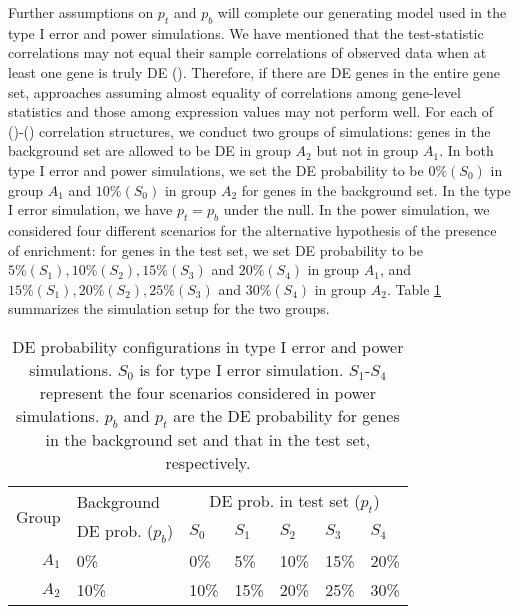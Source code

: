 	Further assumptions on $p_t$ and $p_b$ will complete our generating model used in the type I 
	error and power simulations. %
	We have mentioned that the test-statistic correlations may not equal their sample 
	correlations of observed data when at least one gene is truly DE (\thepapertobefinished). 
	Therefore, if there are DE genes in the entire gene set, 
	approaches assuming	almost equality of correlations among gene-level statistics and those 
	among expression values may not perform well. For each of (\aaCase)-(\fCase) correlation 
	structures, we conduct two groups of simulations: genes in the background set are allowed to be 
	DE in group $A_2$ but not in group $A_1$.  In both type I error and power 
	simulations, we set the DE probability to be $0\%(S_0)$ in group $A_1$ and $10\%(S_0)$ in group 
	$A_2$ for genes in the background set. In the type I error simulation, we have $p_t = p_b$ 
	under the null. In the power simulation, we considered four different scenarios for the 
	alternative hypothesis of the presence of enrichment: for genes in the test set, we set DE
	probability to be $5\% (S_1), 10\%(S_2), 15\%(S_3)$ and $20\%(S_4)$ in group $A_1$, and 
	$15\%(S_1),	20\%(S_2), 25\%(S_3)$ and $30\%(S_4)$ in group $A_2$. Table \ref{table:simusetup} 
	summarizes the simulation setup for the two groups.
	

	
	\begin{table}[!ht]
		\centering
		\caption[DE probability configurations in type I error and power simulations]{DE 
		probability configurations in type I error and power simulations. $S_0$ is for
			type I error simulation. $S_1$-$S_4$ represent the four scenarios considered in power 
			simulations. $p_b$ and $p_t$ are the DE probability for genes in the background set and 
			that in the test set, respectively.}		
		\begin{tabular}{rp{3.7cm}p{1.5cm}p{1.5cm}p{1.5cm}p{1.5cm}p{1.5cm}}
			\hline
			\multirow{2}{*}{Group} & 	Background & \multicolumn{5}{c}{DE prob. in test set 
			($p_t$)}\\  \cline{3-7}
			&DE prob. ($p_b$)&$S_0$ &$S_1$ &$S_2$ &$S_3$ &$S_4$\\
		\hline
			$A_1$ & 0\% & 0\%  & 5\% & 10\% & 15\% & 20\%\\ 
			$A_2$ & 10\% & 10\% & 15\%& 20\%& 25\% & 30\%\\  
		\hline
		\end{tabular}	
		\label{table:simusetup}
	\end{table}
	
